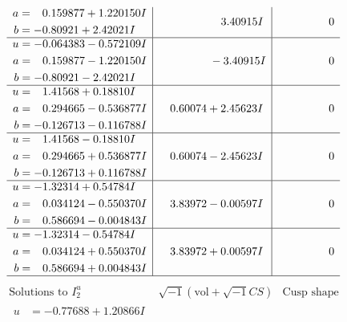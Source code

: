 \documentclass[1p]{elsarticle_modified}
\theoremstyle{definition}
\newcommand{\I}{\sqrt{-1}}
\begin{document}
$$\begin{array}{c|c|c}
\begin{aligned}
a &= \phantom{-}0.159877 + 1.220150 I \\
b &= -0.80921 + 2.42021 I\end{aligned}
 & \phantom{-0.000000 -}3.40915 I & \phantom{-0.000000 } 0 \\ \hline\begin{aligned}
u &= -0.064383 - 0.572109 I \\
a &= \phantom{-}0.159877 - 1.220150 I \\
b &= -0.80921 - 2.42021 I\end{aligned}
 & \phantom{-0.000000 } -3.40915 I & \phantom{-0.000000 } 0 \\ \hline\begin{aligned}
u &= \phantom{-}1.41568 + 0.18810 I \\
a &= \phantom{-}0.294665 - 0.536877 I \\
b &= -0.126713 - 0.116788 I\end{aligned}
 & \phantom{-}0.60074 + 2.45623 I & \phantom{-0.000000 } 0 \\ \hline\begin{aligned}
u &= \phantom{-}1.41568 - 0.18810 I \\
a &= \phantom{-}0.294665 + 0.536877 I \\
b &= -0.126713 + 0.116788 I\end{aligned}
 & \phantom{-}0.60074 - 2.45623 I & \phantom{-0.000000 } 0 \\ \hline\begin{aligned}
u &= -1.32314 + 0.54784 I \\
a &= \phantom{-}0.034124 - 0.550370 I \\
b &= \phantom{-}0.586694 - 0.004843 I\end{aligned}
 & \phantom{-}3.83972 - 0.00597 I & \phantom{-0.000000 } 0 \\ \hline\begin{aligned}
u &= -1.32314 - 0.54784 I \\
a &= \phantom{-}0.034124 + 0.550370 I \\
b &= \phantom{-}0.586694 + 0.004843 I\end{aligned}
 & \phantom{-}3.83972 + 0.00597 I & \phantom{-0.000000 } 0\\
 \hline 
 \end{array}$$\newpage$$\begin{array}{c|c|c}  
\text{Solutions to }I^u_{2}& \I (\text{vol} + \sqrt{-1}CS) & \text{Cusp shape}\\
 \hline 
\begin{aligned}
u &= -0.77688 + 1.20866 I \\

\end{aligned}
\end{array}$$
\end{document}
